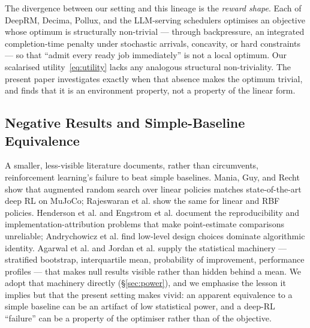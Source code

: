 \documentclass[10pt,twocolumn]{article}
\begin{document}
The divergence between our setting and this lineage is the \emph{reward shape}.
Each of DeepRM, Decima, Pollux, and the LLM-serving schedulers optimises an
objective whose optimum is structurally non-trivial --- through backpressure, an
integrated completion-time penalty under stochastic arrivals, concavity, or hard
constraints --- so that ``admit every ready job immediately'' is not a local
optimum. Our scalarised utility~\eqref{eq:utility} lacks any analogous structural
non-triviality. The present paper investigates exactly when that absence makes
the optimum trivial, and finds that it is an environment property, not a property
of the linear form.

\subsection{Negative Results and Simple-Baseline Equivalence}
A smaller, less-visible literature documents, rather than circumvents,
reinforcement learning's failure to beat simple baselines. Mania, Guy, and Recht
\cite{mania2018ars} show that augmented random search over linear policies
matches state-of-the-art deep RL on MuJoCo; Rajeswaran et al.
\cite{rajeswaran2017simplicity} show the same for linear and RBF policies.
Henderson et al. \cite{henderson2018matters} and Engstrom et al.
\cite{engstrom2020implementation} document the reproducibility and
implementation-attribution problems that make point-estimate comparisons
unreliable; Andrychowicz et al. \cite{andrychowicz2021what} find low-level design
choices dominate algorithmic identity. Agarwal et al. \cite{agarwal2021precipice}
and Jordan et al. \cite{jordan2020evaluating} supply the statistical machinery
--- stratified bootstrap, interquartile mean, probability of improvement,
performance profiles --- that makes null results visible rather than hidden
behind a mean. We adopt that machinery directly (\S\ref{sec:power}), and we
emphasise the lesson it implies but that the present setting makes vivid: an
apparent equivalence to a simple baseline can be an artifact of low statistical
power, and a deep-RL ``failure'' can be a property of the optimiser rather than
of the objective.
\end{document}
